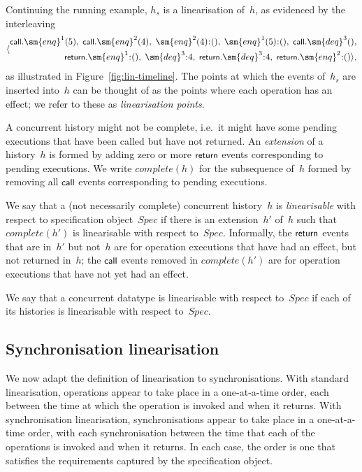 Continuing the running example, $h_s$ is a linearisation of~$h$, as evidenced
by the interleaving
\[
\seq{\begin{align}
  \call.\sm{enq}^1(5),\; \call.\sm{enq}^2(4),\; 
  \sm{enq}^2(4)\::(),\; \sm{enq}^1(5)\::(),\;   \call.\sm{deq}^3(), \\
  \return.\sm{enq}^1\::(),\; \sm{deq}^3\::4,\; 
  \return.\sm{deq}^3\::4,\; \return.\sm{enq}^2\::() },
  \end{align}
\]
as illustrated in  Figure~\ref{fig:lin-timeline}.
The points at which the events of~$h_s$ are inserted into~$h$ can be thought
of as the points where each operation has an effect; we refer to these as
\emph{linearisation points}. 

A concurrent history might not be complete, i.e.~it might have some pending
executions that have been called but have not returned.  An \emph{extension}
of a history~$h$ is formed by adding zero or more $\mbox{\sf{\small return}}$ events
corresponding to pending executions.  We write $complete(h)$ for the
subsequence of~$h$ formed by removing all $\mbox{\sf{\small call}}$ events corresponding to
pending executions.

We say that a (not necessarily complete) concurrent history~$h$ is
\emph{linearisable} with respect to specification object~$Spec$ if there is an
extension~$h'$ of~$h$ such that $complete(h')$ is linearisable with respect
to~$Spec$.  Informally, the $\mbox{\sf{\small return}}$ events that are in~$h'$ but not~$h$ are
for operation executions that have had an effect, but not returned in~$h$; the
$\mbox{\sf{\small call}}$ events removed in $complete(h')$ are for operation executions that
have not yet had an effect.

We say that a concurrent datatype is linearisable with respect to~$Spec$ if
each of its histories is linearisable with respect to~$Spec$.


\subsection{Synchronisation linearisation}
\label{sec:sync-lin}

We now adapt the definition of linearisation to synchronisations.  With
standard linearisation, operations appear to take place in a one-at-a-time
order, each between the time at which the operation is invoked and when it
returns.  With synchronisation linearisation, synchronisations appear to take
place in a one-at-a-time order, with each synchronisation between the time
that each of the operations is invoked and when it returns.  In each case,
the order is one that satisfies the requirements captured by the specification
object.  

